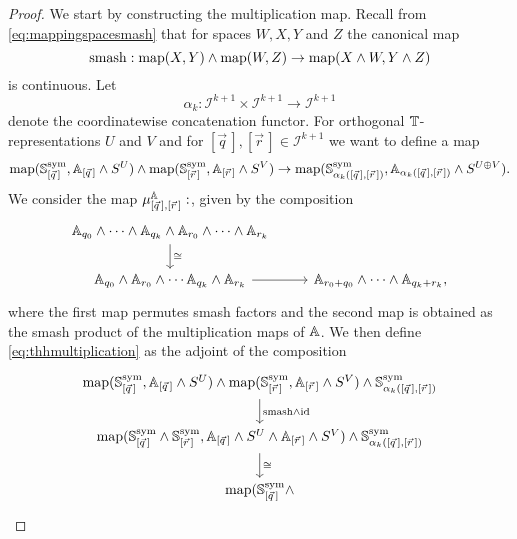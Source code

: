 \begin{proof}
We start by constructing the multiplication map. Recall from \eqref{eq:mappingspacesmash} that
for spaces $W,X,Y$ and $Z$  the canonical map
\[\mathrm{smash}: \mathrm{map}(X,Y)\wedge \mathrm{map}(W,Z)\to \mathrm{map}(X\wedge W, Y\wedge Z)
\]
is continuous.
Let 
\begin{equation}\label{eq:concatenationfunctor}
\alpha_k: \mathcal{I}^{k+1}\times \mathcal{I}^{k+1} 
\to \mathcal{I}^{k+1}
\end{equation}
denote the coordinatewise concatenation functor.
For orthogonal $\mathbb{T}$-representations $U$ and $V$ and
for $[\vec{q}\,], [\vec{r}\,]\in \mathcal{I}^{k+1}$
we want to define a map
\begin{equation}\label{eq:thhmultiplication}
 \mathrm{map}(\mathbb{S}^{\mathrm{sym}}_{[\vec{q}\,]}, \mathbb{A}_{[\vec{q}\,]}\wedge S^U)
\wedge \mathrm{map}(\mathbb{S}^{\mathrm{sym}}_{[\vec{r}\,]}, \mathbb{A}_{[\vec{r}\,]}\wedge S^V)\to 
\mathrm{map}(\mathbb{S}^{\mathrm{sym}}_{\alpha_k([\vec{q}\,],[\vec{r}\,])},\mathbb{A}_{\alpha_k([\vec{q}\,],[\vec{r}\,])}\wedge S^{U\oplus V}).
\end{equation}
We consider the map $\mu^{\mathbb{A}}_{[\vec{q}\,], [\vec{r}\,]}: $,
given by the composition
\[
\begin{tikzcd}
\A_{q_0}\wedge\cdots\wedge \A_{q_k}\wedge \A_{r_0}\wedge \cdots \wedge \A_{r_k}
\arrow{d}{\cong} \\
\A_{q_0}\wedge \A_{r_0}\wedge \cdots\A_{q_k}\wedge \A_{r_k}
\arrow{r}
&\A_{r_0+q_0}\wedge\cdots \wedge \A_{q_k+r_k},
\end{tikzcd}
\]
where the first map permutes smash factors and the second map is
obtained as the smash product of the multiplication maps of $\mathbb{A}$.
We then define \eqref{eq:thhmultiplication} as the adjoint of the composition
\begin{equation}\label{eq:thhmultiplicationadjoint}
\begin{tikzcd}
 \map(\spherespectrum^{\mathrm{sym}}_{[\vec{q}\,]}, \A_{[\vec{q}\,]}\wedge S^U)
\wedge \map(\spherespectrum^{\mathrm{sym}}_{[\vec{r}\,]}, \A_{[\vec{r}\,]}\wedge S^V)
\wedge \spherespectrum^{\mathrm{sym}}_{\alpha_k([\vec{q}\,],[\vec{r}\,])}
\arrow{d}{\mathrm{smash}\wedge \mathrm{id}}\\
\map(\spherespectrum^{\mathrm{sym}}_{[\vec{q}\,]} \wedge 
\spherespectrum^{\mathrm{sym}}_{[\vec{r}\,]}, \A_{[\vec{q}\,]}\wedge S^U\wedge
\A_{[\vec{r}\,]}\wedge S^V) \wedge \spherespectrum^{\mathrm{sym}}_{\alpha_k([\vec{q}\,],[\vec{r}\,])}
 \arrow{d}{\cong}\\
\map(\spherespectrum^{\mathrm{sym}}_{[\vec{q}\,]} \wedge 

\end{tikzcd}
\end{equation}
\end{proof}
